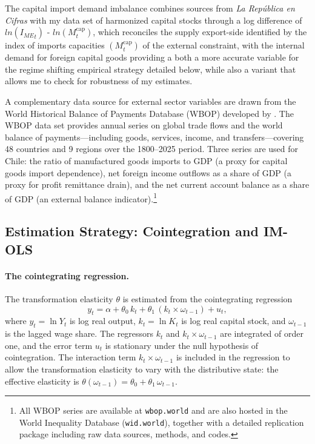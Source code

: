 The capital import demand imbalance combines sources from \textit{La República en Cifras} with my data set of harmonized capital stocks through a log difference of $ln({I_{ME}}_t)$ - $ln(M^{\text{cap}}_t)$, which reconciles the supply export-side identified by the index of imports capacities $(M^{\text{cap}}_t)$ of the external constraint, with the internal demand for foreign capital goods providing a both a more accurate variable for the regime shifting empirical strategy detailed below, while also a variant that allows me to check for robustness of my estimates. 

A complementary data source for external sector variables are drawn from the World Historical Balance of Payments Database (WBOP) developed by
\citet{NievasPiketty2025}. The WBOP data set provides annual series on global trade flows and the world balance of payments---including goods,
services, income, and transfers---covering 48 countries and 9 regions over
the 1800--2025 period. Three series are used for Chile: the ratio
of manufactured goods imports to GDP (a proxy for capital goods
import dependence), net foreign income outflows as a share of GDP (a
proxy for profit remittance drain), and the net current account
balance as a share of GDP (an external balance indicator).\footnote{All WBOP
	series are available at \texttt{wbop.world} and are also hosted in
	the World Inequality Database (\texttt{wid.world}), together with a
	detailed replication package including raw data sources, methods,
	and codes.}




\subsection{Estimation Strategy: Cointegration and IM-OLS}
\label{sec:42:estimation_strategy}

\paragraph{The cointegrating regression.}
The transformation elasticity $\theta$ is estimated from the
cointegrating regression
\begin{equation}
	y_t = \alpha + \theta_0\, k_t
	+ \theta_1\, (k_t \times \omega_{t-1}) + u_t,
	\label{eq:421:coint_reg}
\end{equation}
where $y_t = \ln Y_t$ is log real output, $k_t = \ln K_t$ is log
real capital stock, and $\omega_{t-1}$ is the lagged wage share.
The regressors $k_t$ and $k_t \times \omega_{t-1}$ are integrated
of order one, and the error term $u_t$ is stationary under the null
hypothesis of cointegration. The interaction term
$k_t \times \omega_{t-1}$ is included in the regression to allow
the transformation elasticity to vary with the distributive state:
the effective elasticity is $\theta(\omega_{t-1}) = \theta_0
+ \theta_1\, \omega_{t-1}$.

